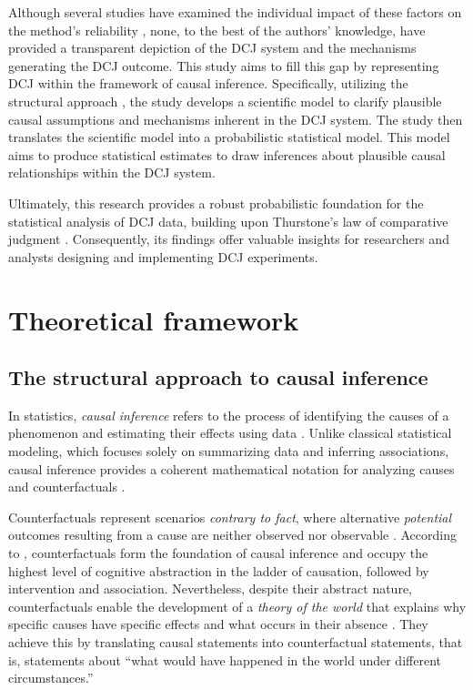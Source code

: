 \documentclass[
  authoryear,
  preprint,
  1p]{elsarticle}
\begin{document}
Although several studies have examined the individual impact of these
factors on the method's reliability
\citep{Bramley_2015, Pollitt_2012b, Bramley_et_al_2019, Verhavert_et_al_2019, Crompvoets_et_al_2022, vanDaal_et_al_2017, Gijsen_et_al_2021},
none, to the best of the authors' knowledge, have provided a transparent
depiction of the DCJ system and the mechanisms generating the DCJ
outcome. This study aims to fill this gap by representing DCJ within the
framework of causal inference. Specifically, utilizing the structural
approach \citep{Wright_1921, Pearl_2009, Pearl_et_al_2016}, the study
develops a scientific model to clarify plausible causal assumptions and
mechanisms inherent in the DCJ system. The study then translates the
scientific model into a probabilistic statistical model. This model aims
to produce statistical estimates to draw inferences about plausible
causal relationships within the DCJ system.

Ultimately, this research provides a robust probabilistic foundation for
the statistical analysis of DCJ data, building upon Thurstone's law of
comparative judgment \citeyearpar{Thurstone_1927}. Consequently, its
findings offer valuable insights for researchers and analysts designing
and implementing DCJ experiments.

\section{Theoretical framework}\label{sec-framework}

\subsection{The structural approach to causal
inference}\label{sec-framework-structural}

In statistics, \emph{causal inference} refers to the process of
identifying the causes of a phenomenon and estimating their effects
using data \citep{Shaughnessy_et_al_2010, Neal_2020}. Unlike classical
statistical modeling, which focuses solely on summarizing data and
inferring associations, causal inference provides a coherent
mathematical notation for analyzing causes and counterfactuals
\citep{Pearl_2009}.

Counterfactuals represent scenarios \emph{contrary to fact}, where
alternative \emph{potential} outcomes resulting from a cause are neither
observed nor observable \citep{Neal_2020, Counterfactual_2024}.
According to \citet{Pearl_et_al_2018}, counterfactuals form the
foundation of causal inference and occupy the highest level of cognitive
abstraction in the ladder of causation, followed by intervention and
association. Nevertheless, despite their abstract nature,
counterfactuals enable the development of a \emph{theory of the world}
that explains why specific causes have specific effects and what occurs
in their absence \citep{Pearl_et_al_2018}. They achieve this by
translating causal statements into counterfactual statements, that is,
statements about ``what would have happened in the world under different
circumstances.''
\end{document}
